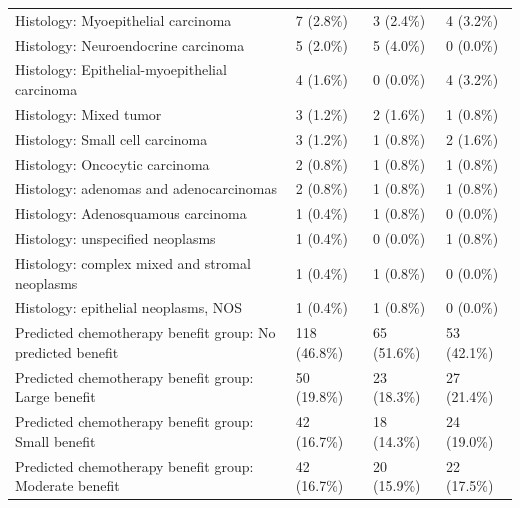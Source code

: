 \documentclass[10pt,twocolumn]{article}
\begin{document}
\begin{table}[t]
\begin{tabular}{p{}p{}p{}p{}}
Histology: Myoepithelial carcinoma & 7 (2.8\%) & 3 (2.4\%) & 4 (3.2\%) \\
Histology: Neuroendocrine carcinoma & 5 (2.0\%) & 5 (4.0\%) & 0 (0.0\%) \\
Histology: Epithelial-myoepithelial carcinoma & 4 (1.6\%) & 0 (0.0\%) & 4 (3.2\%) \\
Histology: Mixed tumor & 3 (1.2\%) & 2 (1.6\%) & 1 (0.8\%) \\
Histology: Small cell carcinoma & 3 (1.2\%) & 1 (0.8\%) & 2 (1.6\%) \\
Histology: Oncocytic carcinoma & 2 (0.8\%) & 1 (0.8\%) & 1 (0.8\%) \\
Histology: adenomas and adenocarcinomas & 2 (0.8\%) & 1 (0.8\%) & 1 (0.8\%) \\
Histology: Adenosquamous carcinoma & 1 (0.4\%) & 1 (0.8\%) & 0 (0.0\%) \\
Histology: unspecified neoplasms & 1 (0.4\%) & 0 (0.0\%) & 1 (0.8\%) \\
Histology: complex mixed and stromal neoplasms & 1 (0.4\%) & 1 (0.8\%) & 0 (0.0\%) \\
Histology: epithelial neoplasms, NOS & 1 (0.4\%) & 1 (0.8\%) & 0 (0.0\%) \\
Predicted chemotherapy benefit group: No predicted benefit & 118 (46.8\%) & 65 (51.6\%) & 53 (42.1\%) \\
Predicted chemotherapy benefit group: Large benefit & 50 (19.8\%) & 23 (18.3\%) & 27 (21.4\%) \\
Predicted chemotherapy benefit group: Small benefit & 42 (16.7\%) & 18 (14.3\%) & 24 (19.0\%) \\
Predicted chemotherapy benefit group: Moderate benefit & 42 (16.7\%) & 20 (15.9\%) & 22 (17.5\%) \\
\bottomrule
\end{tabular}
\end{table}
\end{document}
